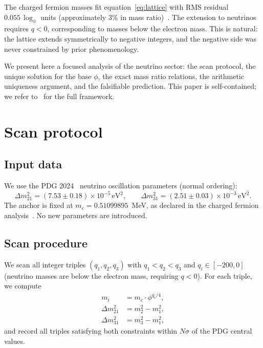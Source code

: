 \documentclass[12pt]{article}
\theoremstyle{definition}
\begin{document}
The charged fermion masses fit equation~\eqref{eq:lattice} with
RMS residual $0.055\,\log_\phi$ units (approximately $3\%$ in mass
ratio)~\cite{Gentry:CORE}. The extension to neutrinos requires
$q < 0$, corresponding to masses below the electron mass. This is
natural: the lattice extends symmetrically to negative integers,
and the negative side was never constrained by prior phenomenology.

We present here a focused analysis of the neutrino sector: the scan
protocol, the unique solution for the base $\phi$, the exact mass
ratio relations, the arithmetic uniqueness argument, and the
falsifiable prediction. This paper is self-contained; we refer
to~\cite{Gentry:CORE} for the full framework.

\section{Scan protocol}
\label{sec:scan}

\subsection{Input data}

We use the PDG 2024~\cite{PDG2024} neutrino oscillation parameters
(normal ordering):
\begin{equation}
  \Delta m^2_{21} = (7.53 \pm 0.18) \times 10^{-5}\,\text{eV}^2,
  \qquad
  \Delta m^2_{31} = (2.51 \pm 0.03) \times 10^{-3}\,\text{eV}^2.
  \label{eq:pdg}
\end{equation}
The anchor is fixed at $m_e = 0.51099895$~MeV, as declared in the
charged fermion analysis~\cite{Gentry:CORE}. No new parameters are
introduced.

\subsection{Scan procedure}

We scan all integer triples $(q_1, q_2, q_3)$ with $q_1 < q_2 < q_3$
and $q_i \in [-200, 0]$ (neutrino masses are below the electron mass,
requiring $q < 0$). For each triple, we compute
\begin{align}
  m_i &= m_e \cdot \phi^{q_i/4}, \\
  \Delta m^2_{21} &= m_2^2 - m_1^2, \\
  \Delta m^2_{31} &= m_3^2 - m_1^2,
\end{align}
and record all triples satisfying both constraints within $N\sigma$
of the PDG central values.
\end{document}
